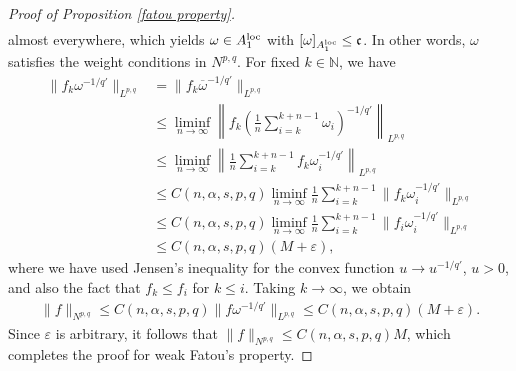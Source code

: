 \documentclass[10pt,reqno]{amsart}
\numberwithin{equation}{section}
\begin{document}
\begin{proof}[Proof of Proposition \ref{fatou property}]
\begin{align*}
\end{align*}
almost everywhere, which yields $\omega\in A_{1}^{\rm loc}$ with $[\omega]_{A_{1}^{\rm loc}}\leq\mathfrak{c}$. In other words, $\omega$ satisfies the weight conditions in $N^{p,q}$. For fixed $k\in\mathbb{N}$, we have 
\begin{align*}
\|f_{k}\omega^{-1/q'}\|_{L^{p,q}}&=\|f_{k}\overline{\omega}^{-1/q'}\|_{L^{p,q}}\\
&\leq\liminf_{n\rightarrow\infty}\left\|f_{k}\left(\frac{1}{n}\sum_{i=k}^{k+n-1}\omega_{i}\right)^{-1/q'}\right\|_{L^{p,q}}\\
&\leq\liminf_{n\rightarrow\infty}\left\|\frac{1}{n}\sum_{i=k}^{k+n-1}f_{k}\omega_{i}^{-1/q'}\right\|_{L^{p,q}}\\
&\leq C(n,\alpha,s,p,q)\liminf_{n\rightarrow\infty}\frac{1}{n}\sum_{i=k}^{k+n-1}\|f_{k}\omega_{i}^{-1/q'}\|_{L^{p,q}}\\
&\leq C(n,\alpha,s,p,q)\liminf_{n\rightarrow\infty}\frac{1}{n}\sum_{i=k}^{k+n-1}\|f_{i}\omega_{i}^{-1/q'}\|_{L^{p,q}}\\
&\leq C(n,\alpha,s,p,q)(M+\varepsilon),
\end{align*}
where we have used Jensen's inequality for the convex function $u\rightarrow u^{-1/q'}$, $u>0$, and also the fact that $f_{k}\leq f_{i}$ for $k\leq i$. Taking $k\rightarrow\infty$, we obtain
\begin{align*}
\|f\|_{N^{p,q}}\leq C(n,\alpha,s,p,q)\|f\omega^{-1/q'}\|_{L^{p,q}}\leq C(n,\alpha,s,p,q)(M+\varepsilon).
\end{align*}
Since $\varepsilon$ is arbitrary, it follows that $\|f\|_{N^{p,q}}\leq C(n,\alpha,s,p,q)M$, which completes the proof for weak Fatou's property.


\end{proof}
\end{document}
